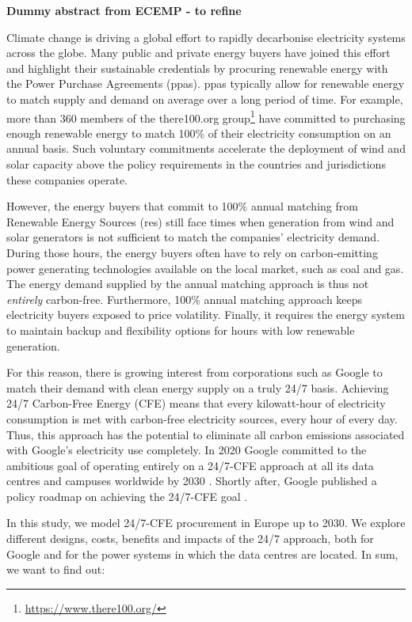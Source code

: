 \textbf{Dummy abstract from ECEMP - to refine}

Climate change is driving a global effort to rapidly decarbonise electricity systems across the globe. 
Many public and private energy buyers have joined this effort and highlight their sustainable credentials by procuring renewable energy with the Power Purchase Agreements (\gls{ppa}s).
\gls{ppa}s typically allow for renewable energy to match supply and demand on average over a long period of time. 
For example, more than 360 members of the there100.org group\footnote{\url{https://www.there100.org/}} have committed to purchasing enough renewable energy to match 100\% of their electricity consumption on an annual basis. 
Such voluntary commitments accelerate the deployment of wind and solar capacity above the policy requirements in the countries and jurisdictions these companies operate.

However, the energy buyers that commit to 100\% annual matching from Renewable Energy Sources (\gls{res}) still face times when generation from wind and solar generators is not sufficient to match the companies' electricity demand.
During those hours, the energy buyers often have to rely on carbon-emitting power generating technologies available on the local market, such as coal and gas. 
The energy demand supplied by the annual matching approach is thus not \textit{entirely} carbon-free. 
Furthermore, 100\% annual matching approach keeps electricity buyers exposed to price volatility. 
Finally, it requires the energy system to maintain backup and flexibility options for hours with low renewable generation.

For this reason, there is growing interest from corporations such as Google to match their demand with clean energy supply on a truly 24/7 basis. 
Achieving 24/7 Carbon-Free Energy (CFE) means that every kilowatt-hour of electricity consumption is met with carbon-free electricity sources, every hour of every day. 
Thus, this approach has the potential to eliminate all carbon emissions associated with Google's electricity use completely. 
In 2020 Google committed to the ambitious goal of operating entirely on a 24/7-CFE approach at all its data centres and campuses worldwide by 2030 \cite{Google-1}. 
Shortly after, Google published a policy roadmap on achieving the 24/7-CFE goal \cite{Google-2}.

In this study, we model 24/7-CFE procurement in Europe up to 2030. 
We explore different designs, costs, benefits and impacts of the 24/7 approach, both for Google and for the power systems in which the data centres are located. 
In sum, we want to find out: 

